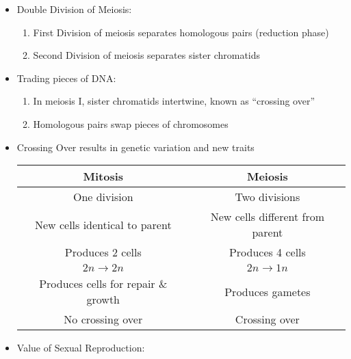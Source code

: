 \documentclass[12pt]{article}
\begin{document}
\begin{itemize}
  \item Double Division of Meiosis:

    \begin{enumerate}

      \item First Division of meiosis separates homologous pairs (reduction phase)

      \item Second Division of meiosis separates sister chromatids 

    \end{enumerate}

  \item Trading pieces of DNA:

    \begin{enumerate}

      \item In meiosis I, sister chromatids intertwine, known as ``crossing over''

      \item Homologous pairs swap pieces of chromosomes

    \end{enumerate}

  \item Crossing Over results in genetic variation and new traits

    \begin{center}
    \begin{tabular}[H]{| c | c |}
      \hline
      Mitosis & Meiosis \\
      \hline
      One division & Two divisions \\
      \hline
      New cells identical to parent & New cells different from parent \\
      \hline
      Produces 2 cells & Produces 4 cells \\
      \hline
      $2n\rightarrow2n$ & $2n\rightarrow1n$ \\
      \hline
      Produces cells for repair \& growth & Produces gametes \\
      \hline
      No crossing over & Crossing over \\
      \hline
    \end{tabular}
  \end{center}

\item Value of Sexual Reproduction:

  \begin{enumerate}


\end{enumerate}
\end{itemize}
\end{document}
